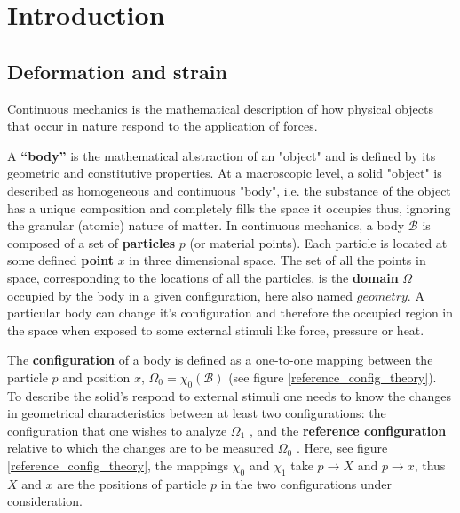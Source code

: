 \section{Introduction}\label{section:introductionbiomecamodelsbackground}
\label{section:continuousmechanics}

\subsection{Deformation and strain}%
Continuous mechanics is the mathematical description of how  physical objects that occur in nature respond to the application of forces.

	A \textbf{“body”} is the mathematical abstraction of an "object" and is defined by its geometric and constitutive properties.  At a macroscopic level, a solid "object" is described as homogeneous and continuous "body", i.e. the substance of the object has a unique composition and completely fills the space it occupies thus, ignoring the granular (atomic) nature of matter. In continuous mechanics, a body $\mathcal{B}$ is composed of a set of \textbf{particles} $p$  (or material points). Each particle is located at some defined \textbf{point}  $x$ in three dimensional space. The set of all the points in space, corresponding to the locations of all the particles, is the \textbf{domain} $\Omega$  occupied by the body in a given configuration, here also named $geometry$. A particular body can change it's configuration and therefore the occupied region in the space when exposed to some external stimuli like force, pressure or heat.
	
 The \textbf{configuration} of a body is defined as a one-to-one mapping between the particle $p$ and position $x$, $\Omega_0 = \chi_0 (\mathcal{B})$ (see figure \ref{reference_config_theory}). To describe the solid's respond to external stimuli one needs to know the changes in geometrical characteristics between at least two configurations: the configuration that one wishes to analyze $\Omega_1$ , and the \textbf{reference configuration} relative to which the changes are to be measured $\Omega_0$  . Here, see figure \ref{reference_config_theory}, the mappings $\chi_0$ and $\chi_1$ take $p \rightarrow X$ and $p \rightarrow x$, thus $X$ and $x$ are the positions of particle $p$ in the two configurations under consideration.

